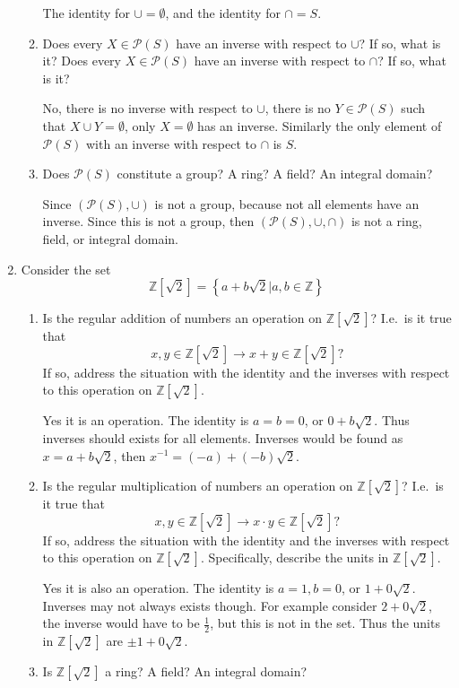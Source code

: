 \documentclass[10pt]{amsart}
\begin{document}
\begin{enumerate}
\begin{enumerate}[listparindent=0.7cm]
        The identity for $\cup=\emptyset$, and the identity for $\cap=S$.
      \item Does every $X\in\mathcal{P}(S)$ have an inverse with respect to
        $\cup$? If so, what is it? Does every $X\in\mathcal{P}(S)$ have an
        inverse with respect to $\cap$? If so, what is it?

        No, there is no inverse with respect to $\cup$, there is no
        $Y\in\mathcal{P}(S)$ such that $X\cup Y=\emptyset$, only $X=\emptyset$
        has an inverse. Similarly the only element of $\mathcal{P}(S)$ with an
        inverse with respect to $\cap$ is $S$.
      \item Does $\mathcal{P}(S)$ constitute a group? A ring? A field? An
        integral domain?

        Since $(\mathcal{P}(S), \cup)$ is not a group, because not all elements
        have an inverse. Since this is not a group, then
        $(\mathcal{P}(S),\cup,\cap)$ is not a ring, field, or integral domain.
    \end{enumerate}
  \item Consider the set
    \[\mathbb{Z}\left[\sqrt{2}\right]=\left\{a+b\sqrt{2}|a,b\in\mathbb{Z}\right\}\]
    \begin{enumerate}[listparindent=0.7cm]
      \item Is the regular addition of numbers an operation on
        $\mathbb{Z}\left[\sqrt{2}\right]$? I.e.\ is it true that
        \[x,y\in\mathbb{Z}\left[\sqrt{2}\right]\rightarrow
        x+y\in\mathbb{Z}\left[\sqrt{2}\right]?\] If so, address the situation
        with the identity and the inverses with respect to this operation on
        $\mathbb{Z}\left[\sqrt{2}\right]$.

        Yes it is an operation. The identity is $a=b=0$, or $0+b\sqrt{2}$. Thus
        inverses should exists for all elements. Inverses would be found as
        $x=a+b\sqrt{2}$, then $x^{-1}=(-a)+(-b)\sqrt{2}$.
      \item Is the regular multiplication of numbers an operation on
        $\mathbb{Z}\left[\sqrt{2}\right]$? I.e.\ is it true that
        \[x,y\in\mathbb{Z}\left[\sqrt{2}\right]\rightarrow x\cdot
        y\in\mathbb{Z}\left[\sqrt{2}\right]?\] If so, address the situation
        with the identity and the inverses with respect to this operation on
        $\mathbb{Z}\left[\sqrt{2}\right]$. Specifically, describe the units in
        $\mathbb{Z}\left[\sqrt{2}\right]$.

        Yes it is also an operation. The identity is $a=1,b=0$, or
        $1+0\sqrt{2}$. Inverses may not always exists though. For example
        consider $2+0\sqrt{2}$, the inverse would have to be $\frac{1}{2}$, but
        this is not in the set. Thus the units in
        $\mathbb{Z}\left[\sqrt{2}\right]$ are $\pm1+0\sqrt{2}$.
      \item Is $\mathbb{Z}\left[\sqrt{2}\right]$ a ring? A field? An integral
        domain?


\end{enumerate}
\end{enumerate}
\end{document}
